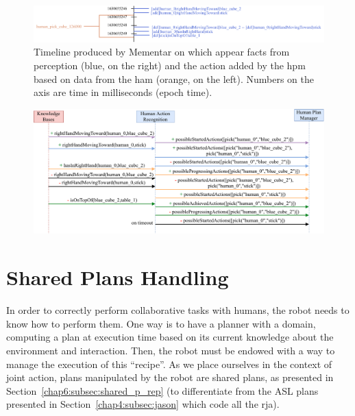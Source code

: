 \documentclass[a4paper,11pt,twoside]{StyleThese}
\begin{document}
\begin{landscape}
	\begin{figure}[!htb]
		\centering
		\includegraphics[width=\linewidth]{figures/chapter2/action_reco_1.pdf}
		\caption{Timeline produced by Mementar on which appear facts from perception (blue, on the right) and the action added by the \acrlong{hpm} based on data from the \acrlong{ham} (orange, on the left). Numbers on the axis are time in milliseconds (epoch time).}
		\label{chap6:fig:action_reco_ex1_timeline}
	\end{figure}
	
	\begin{figure}[!htb]
		\centering
		\includegraphics[width=0.8\linewidth]{figures/chapter2/action_monitoring_ex1.pdf}
		\caption{}
		\label{chap6:fig:action_reco_ex1}
	\end{figure}
\end{landscape}
\restoregeometry

\section{Shared Plans Handling}\label{chap6:sec:plan_handling}
In order to correctly perform collaborative tasks with humans, the robot needs to know how to perform them. One way is to have a planner with a domain, computing a plan at execution time based on its current knowledge about the environment and interaction. Then, the robot must be endowed with a way to manage the execution of this ``recipe''. As we place ourselves in the context of joint action, plans manipulated by the robot are shared plans, as presented in Section~\ref{chap6:subsec:shared_p_rep} (to differentiate from the ASL plans presented in Section~\ref{chap4:subsec:jason} which code all the \acrshort{rja}).
\end{document}
